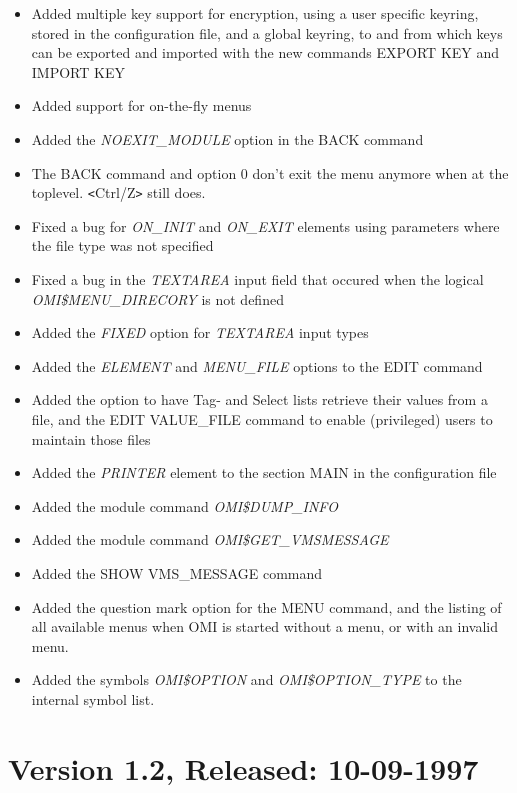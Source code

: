 \documentclass[a4paper]{book}
\newcommand{\lt}{\texttt{<}}
\newcommand{\gt}{\texttt{>}}
\begin{document}
\begin{itemize}
\item Added multiple key support for encryption, using a user specific keyring, stored in the configuration file, and a global keyring, to and from which keys can be exported and imported with the new commands \textsf{EXPORT KEY} and \textsf{IMPORT KEY}
\item Added support for on-the-fly menus
\item Added the \textsl{NOEXIT{\_}MODULE} option in the \textsf{BACK} command
\item The \textsf{BACK} command and option \textsf{0} don't exit the menu anymore when at the toplevel. \lt Ctrl/Z\gt{} still does.
\item Fixed a bug for \textsl{ON{\_}INIT} and \textsl{ON{\_}EXIT} elements using parameters where the file type was not specified
\item Fixed a bug in the \textsl{TEXTAREA} input field that occured when the logical \textsl{OMI{\$}MENU{\_}DIRECORY} is not defined
\item Added the \textsl{FIXED} option for \textsl{TEXTAREA} input types
\item Added the \textsl{ELEMENT} and \textsl{MENU{\_}FILE} options to the \textsf{EDIT} command
\item Added the option to have Tag- and Select lists retrieve their values from a file, and the \textsf{EDIT VALUE{\_}FILE} command to enable (privileged) users to maintain those files
\item Added the \textsl{PRINTER} element to the section MAIN in the configuration file
\item Added the module command \textsl{OMI{\$}DUMP{\_}INFO}
\item Added the module command \textsl{OMI{\$}GET{\_}VMSMESSAGE}
\item Added the \textsf{SHOW VMS{\_}MESSAGE} command
\item Added the question mark option for the \textsf{MENU} command, and the listing of all available menus when OMI is started without a menu, or with an invalid menu.
\item Added the symbols \textsl{OMI{\$}OPTION} and \textsl{OMI{\$}OPTION{\_}TYPE} to the internal symbol list.
\end{itemize}

\section*{Version 1.2, Released: 10-09-1997}
\end{document}
